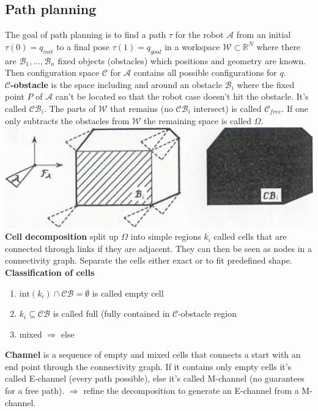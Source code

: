 \documentclass[12pt]{article}
\newcommand{\R}{\mathbb{R}}
\begin{document}
	\subsection{Path planning}
	The goal of path planning is to find a path $\tau$ for the robot $\mathcal{A}$ from an initial $\tau(0) = q_{init}$ to a final pose $\tau(1) = q_{goal}$ in a workspace $\mathcal{W} \subset \R^N$ where there are $\mathcal{B}_1, ..., \mathcal{B}_n$ fixed objects (obstacles) which positions and geometry are known. Then configuration space $\mathcal{C}$ for $\mathcal{A}$ contains all possible configurations for $q$.\\
	\textbf{$\mathcal{C}$-obstacle} is the space including and around an obstacle $\mathcal{B}_i$ where the fixed point $P$ of $\mathcal{A}$ can't be located so that the robot case doesn't hit the obstacle. It's called $\mathcal{CB}_i$. The parts of $\mathcal{W}$ that remains (no $\mathcal{CB}_i$ intersect) is called $\mathcal{C}_{free}$. If one only subtracts the obstacles from $\mathcal{W}$ the remaining space is called $\Omega$.\\
	\includegraphics[width=\linewidth]{figures/c-obstacle.png}\\
	\textbf{Cell decomposition} split up $\Omega$ into simple regions $k_i$ called cells that are connected through links if they are adjacent. They can then be seen as nodes in a connectivity graph. Separate the cells either exact or to fit predefined shape.\\
	\textbf{Classification of cells}
	\begin{enumerate}
		\item $\mathrm{int}(k_i) \cap \mathcal{CB} = \emptyset$ is called empty cell
		\item $k_i \subseteq \mathcal{CB}$ is called full (fully contained in $\mathcal{C}$-obstacle region
		\item mixed $\Rightarrow$ else
	\end{enumerate}
	\textbf{Channel} is a sequence of empty and mixed cells that connects a start with an end point through the connectivity graph. If it contains only empty cells it's called E-channel (every path possible), else it's called M-channel (no guarantees for a free path). $\Rightarrow$ refine the decomposition to generate an E-channel from a M-channel.
\end{document}
